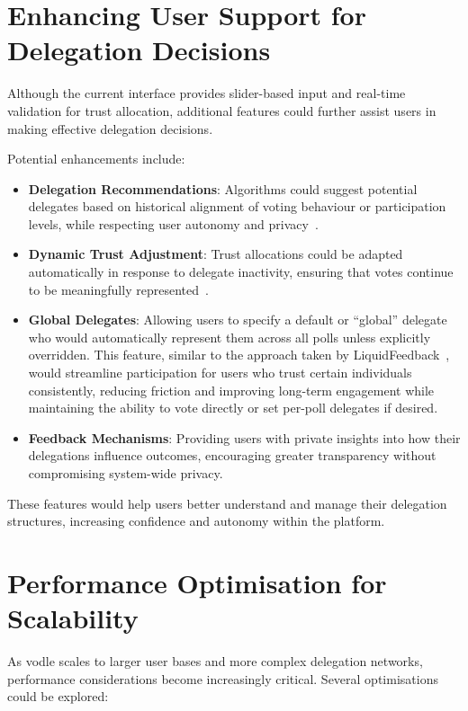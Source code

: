 \section{Enhancing User Support for Delegation Decisions}

Although the current interface provides slider-based input and real-time validation for trust allocation, additional features could further assist users in making effective delegation decisions.

Potential enhancements include:

\begin{itemize}
    \item \textbf{Delegation Recommendations}: Algorithms could suggest potential delegates based on historical alignment of voting behaviour or participation levels, while respecting user autonomy and privacy~\cite{colony}.
    \item \textbf{Dynamic Trust Adjustment}: Trust allocations could be adapted automatically in response to delegate inactivity, ensuring that votes continue to be meaningfully represented~\cite{burke2007trust}.
    \item \textbf{Global Delegates}: Allowing users to specify a default or ``global'' delegate who would automatically represent them across all polls unless explicitly overridden. This feature, similar to the approach taken by LiquidFeedback~\cite{liquidfeedbackbook}, would streamline participation for users who trust certain individuals consistently, reducing friction and improving long-term engagement while maintaining the ability to vote directly or set per-poll delegates if desired.
    \item \textbf{Feedback Mechanisms}: Providing users with private insights into how their delegations influence outcomes, encouraging greater transparency without compromising system-wide privacy.
\end{itemize}

These features would help users better understand and manage their delegation structures, increasing confidence and autonomy within the platform.

\section{Performance Optimisation for Scalability}

As vodle scales to larger user bases and more complex delegation networks, performance considerations become increasingly critical. Several optimisations could be explored:

